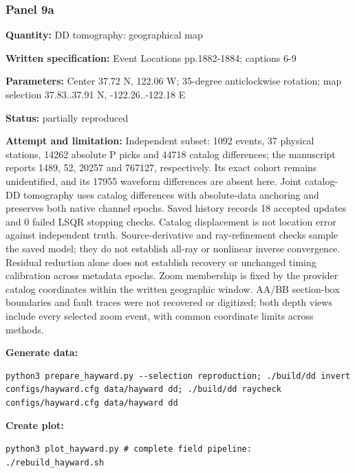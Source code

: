 \subsubsection*{Panel 9a}
\noindent\textbf{Quantity:} DD tomography: geographical map\par
\noindent\textbf{Written specification:} Event Locations pp.1882-1884; captions 6-9\par
\noindent\textbf{Parameters:} Center 37.72 N, 122.06 W; 35-degree anticlockwise rotation; map selection 37.83..37.91 N, -122.26..-122.18 E\par
\noindent\textbf{Status:} partially reproduced\par
\noindent\textbf{Attempt and limitation:} Independent subset: 1092 events, 37 physical stations, 14262 absolute P picks and 44718 catalog differences; the manuscript reports 1489, 52, 20257 and 767127, respectively. Its exact cohort remains unidentified, and its 17955 waveform differences are absent here. Joint catalog-DD tomography uses catalog differences with absolute-data anchoring and preserves both native channel epochs. Saved history records 18 accepted updates and 0 failed LSQR stopping checks. Catalog displacement is not location error against independent truth. Source-derivative and ray-refinement checks sample the saved model; they do not establish all-ray or nonlinear inverse convergence. Residual reduction alone does not establish recovery or unchanged timing calibration across metadata epochs. Zoom membership is fixed by the provider catalog coordinates within the written geographic window. AA/BB section-box boundaries and fault traces were not recovered or digitized; both depth views include every selected zoom event, with common coordinate limits across methods.\par
\noindent\textbf{Generate data:}
\begin{lstlisting}
python3 prepare_hayward.py --selection reproduction; ./build/dd invert configs/hayward.cfg data/hayward dd; ./build/dd raycheck configs/hayward.cfg data/hayward dd
\end{lstlisting}
\noindent\textbf{Create plot:}
\begin{lstlisting}
python3 plot_hayward.py # complete field pipeline: ./rebuild_hayward.sh
\end{lstlisting}
